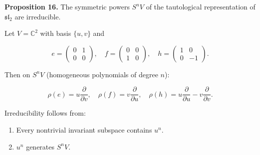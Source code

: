 \textbf{Proposition 16.}
The symmetric powers $S^n V$ of the tautological representation of $\mathfrak{sl}_2$
are irreducible.

Let $V=\mathbb{C}^2$ with basis $\{u,v\}$ and

\[
e =
\begin{pmatrix}
0 & 1 \\
0 & 0
\end{pmatrix},
\quad
f =
\begin{pmatrix}
0 & 0 \\
1 & 0
\end{pmatrix},
\quad
h =
\begin{pmatrix}
1 & 0 \\
0 & -1
\end{pmatrix}.
\]

Then on $S^n V$ (homogeneous polynomials of degree $n$):

\[
\rho(e) = u \frac{\partial}{\partial v},
\quad
\rho(f) = v \frac{\partial}{\partial u},
\quad
\rho(h) = u \frac{\partial}{\partial u}
-
v \frac{\partial}{\partial v}.
\]

Irreducibility follows from:

\begin{enumerate}
\item Every nontrivial invariant subspace contains $u^n$.
\item $u^n$ generates $S^n V$.
\end{enumerate}